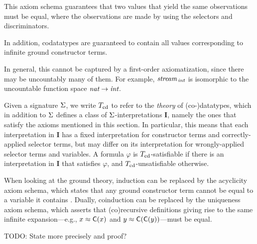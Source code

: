 This axiom schema guarantees that two values that yield the same
observations must be equal, where the observations are made by using the
selectors and discriminators.
%
\begin{report}\par\end{report}
In addition, codatatypes are guaranteed to contain all values corresponding to
infinite ground constructor terms.
\begin{report}
In general, this cannot be captured by a
first-order axiomatization, since there may be uncountably many of them.
For example, $\textit{stream}_{\,\textit{int}}$ is isomorphic to the uncountable
function space $\textit{nat} \to \textit{int}$.
\end{report}


Given a signature $\mathrm{\Sigma}$, we write $T_{\mathrm{cd}}$ to refer to the \emph{theory} of (co-)datatypes,
which in addition to $\mathrm{\Sigma}$ defines a class of $\mathrm{\Sigma}$-interpretations $\mathbf{I}$,
namely the ones that satisfy the axioms mentioned in this section.
In particular, this means that each interpretation in $\mathbf{I}$ has a fixed interpretation
for constructor terms and correctly-applied selector terms, but may differ on its interpretation for
wrongly-applied selector terms and variables.
A formula $\varphi$ is $T_{\mathrm{cd}}$-satisfiable if there is an interpretation in $\mathbf{I}$ that satisfies $\varphi$,
and $T_{\mathrm{cd}}$-unsatisfiable otherwise.

When looking at the ground theory, induction can be replaced by the acyclicity
axiom schema, which states that any ground constructor term cannot be equal to
a variable it contains \cite{xxx}. Dually, coinduction can be replaced by the
uniqueness axiom schema, which asserts that (co)recursive definitions giving
rise to the same infinite expansion---e.g., $x \approx \textsf{C}(x)$ and $y \approx
\textsf{C}(\textsf{C}(y))$---must be equal.

\begin{report}
TODO: State more precisely and proof?
\end{report}


